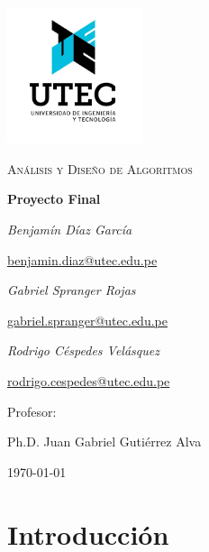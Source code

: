\documentclass[12pt,a4,paper]{article}
\begin{document}
\begin{titlepage}
	\centering
	\includegraphics[width=0.3\textwidth]{utec2.png}\par\vspace{1cm}
	{\scshape\Large An\'alisis y Diseño de Algoritmos\par}
	\vspace{1.5cm}
	{\huge\bfseries Proyecto Final\par}
	\vspace{1.5cm}
	{\Large\itshape Benjamín Díaz García\par}
	\href{mailto:benjamin.diaz@utec.edu.pe}{benjamin.diaz@utec.edu.pe}\\
	\vspace{0.5cm}
	{\Large\itshape Gabriel Spranger Rojas\par}
	\href{mailto:gabriel.spranger@utec.edu.pe}{gabriel.spranger@utec.edu.pe}\\
	\vspace{0.5cm}
	{\Large\itshape Rodrigo C\'espedes Vel\'asquez\par}
	\href{mailto:rodrigo.cespedes@utec.edu.pe}{rodrigo.cespedes@utec.edu.pe}\\
	\vspace{1.5cm}

	\vfill
	Profesor:\par
	Ph.D. Juan Gabriel Gutiérrez Alva

	\vfill
	{\large \today\par}
\end{titlepage}

\newcommand{\algcost}[2]{\strut\hfill\makebox[1.5cm][l]{#1}\makebox[0cm][l]{#2}}

\section*{Introducción}
\end{document}
